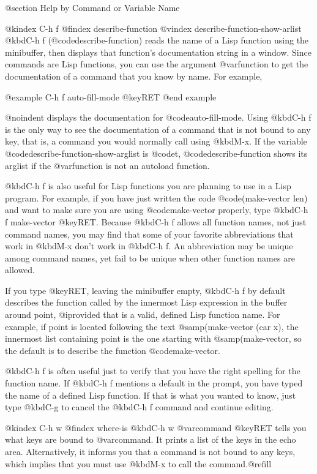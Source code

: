 {{@section Help by Command or Variable Name

@kindex C-h f
@findex describe-function
@vindex describe-function-show-arlist
  @kbd{C-h f} (@code{describe-function}) reads the name of a Lisp
function using the minibuffer, then displays that function's
documentation string in a window.  Since commands are Lisp functions,
you can use the argument @var{function} to get the documentation of a
command that you know by name.  For example,

@example
C-h f auto-fill-mode @key{RET}
@end example

@noindent
displays the documentation for @code{auto-fill-mode}. Using @kbd{C-h f}
is the only way to see the documentation of a command that is not bound
to any key, that is, a command you would normally call using @kbd{M-x}.
If the variable @code{describe-function-show-arglist} is @code{t},
@code{describe-function} shows its arglist if the @var{function} is not
an autoload function.

  @kbd{C-h f} is also useful for Lisp functions you are planning to
use in a Lisp program.  For example, if you have just written the code
@code{(make-vector len)} and want to make sure you are using
@code{make-vector} properly, type @kbd{C-h f make-vector @key{RET}}.  Because
@kbd{C-h f} allows all function names, not just command names, you may find
that some of your favorite abbreviations that work in @kbd{M-x} don't work
in @kbd{C-h f}.  An abbreviation may be unique among command names, yet fail
to be unique when other function names are allowed.


If you type @key{RET}, leaving the minibuffer empty, @kbd{C-h f} by
default describes the function called by the innermost Lisp expression
in the buffer around point, @i{provided} that is a valid, defined Lisp
function name.  For example, if point is located following the text
@samp{(make-vector (car x)}, the innermost list containing point is the
one starting with @samp{(make-vector}, so the default is to describe
the function @code{make-vector}.

  @kbd{C-h f} is often useful just to verify that you have the right
spelling for the function name.  If @kbd{C-h f} mentions a default in the
prompt, you have typed the name of a defined Lisp function.  If that is
what you wanted to know, just type @kbd{C-g} to cancel the @kbd{C-h f}
command and continue editing.

@kindex C-h w
@findex where-is
  @kbd{C-h w @var{command} @key{RET}} tells you what keys are bound to
@var{command}.  It prints a list of the keys in the echo area.
Alternatively, it informs you that a command is not bound to any keys, which
implies that you must use @kbd{M-x} to call the command.@refill

}}
